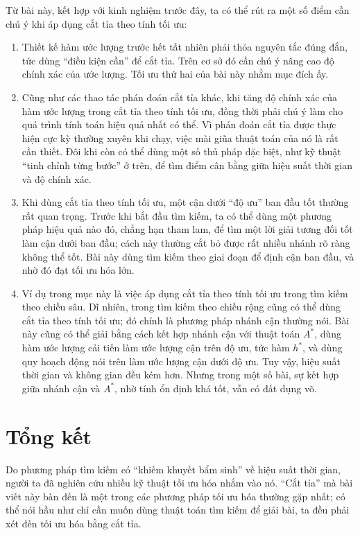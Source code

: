 \documentclass[11pt]{article}
\begin{document}
Từ bài này, kết hợp với kinh nghiệm trước đây, ta có thể rút ra một số điểm
cần chú ý khi áp dụng cắt tỉa theo tính tối ưu:
\begin{enumerate}
  \item Thiết kế hàm ước lượng trước hết tất nhiên phải thỏa nguyên tắc đúng
  đắn, tức dùng ``điều kiện cần'' để cắt tỉa. Trên cơ sở đó cần chú ý nâng
  cao độ chính xác của ước lượng. Tối ưu thứ hai của bài này nhằm mục đích
  ấy.

  \item Cũng như các thao tác phán đoán cắt tỉa khác, khi tăng độ chính xác
  của hàm ước lượng trong cắt tỉa theo tính tối ưu, đồng thời phải chú ý làm
  cho quá trình tính toán hiệu quả nhất có thể. Vì phán đoán cắt tỉa được
  thực hiện cực kỳ thường xuyên khi chạy, việc mài giũa thuật toán của nó là
  rất cần thiết. Đôi khi còn có thể dùng một số thủ pháp đặc biệt, như kỹ
  thuật ``tinh chỉnh từng bước'' ở trên, để tìm điểm cân bằng giữa hiệu suất
  thời gian và độ chính xác.

  \item Khi dùng cắt tỉa theo tính tối ưu, một cận dưới ``độ ưu'' ban đầu tốt
  thường rất quan trọng. Trước khi bắt đầu tìm kiếm, ta có thể dùng một
  phương pháp hiệu quả nào đó, chẳng hạn tham lam, để tìm một lời giải tương
  đối tốt làm cận dưới ban đầu; cách này thường cắt bỏ được rất nhiều nhánh
  rõ ràng không thể tốt. Bài này dùng tìm kiếm theo giai đoạn để định cận ban
  đầu, và nhờ đó đạt tối ưu hóa lớn.

  \item Ví dụ trong mục này là việc áp dụng cắt tỉa theo tính tối ưu trong
  tìm kiếm theo chiều sâu. Dĩ nhiên, trong tìm kiếm theo chiều rộng cũng có
  thể dùng cắt tỉa theo tính tối ưu; đó chính là phương pháp nhánh cận thường
  nói. Bài này cũng có thể giải bằng cách kết hợp nhánh cận với thuật toán
  \(A^\ast\), dùng hàm ước lượng cải tiến làm ước lượng cận trên độ ưu, tức
  hàm \(h^\ast\), và dùng quy hoạch động nói trên làm ước lượng cận dưới độ
  ưu. Tuy vậy, hiệu suất thời gian và không gian đều kém hơn. Nhưng trong một
  số bài, sự kết hợp giữa nhánh cận và \(A^\ast\), nhờ tính ổn định khá tốt,
  vẫn có đất dụng võ.
\end{enumerate}

\section{Tổng kết}

Do phương pháp tìm kiếm có ``khiếm khuyết bẩm sinh'' về hiệu suất thời gian,
người ta đã nghiên cứu nhiều kỹ thuật tối ưu hóa nhắm vào nó. ``Cắt tỉa'' mà
bài viết này bàn đến là một trong các phương pháp tối ưu hóa thường gặp nhất;
có thể nói hầu như chỉ cần muốn dùng thuật toán tìm kiếm để giải bài, ta đều
phải xét đến tối ưu hóa bằng cắt tỉa.
\end{document}
